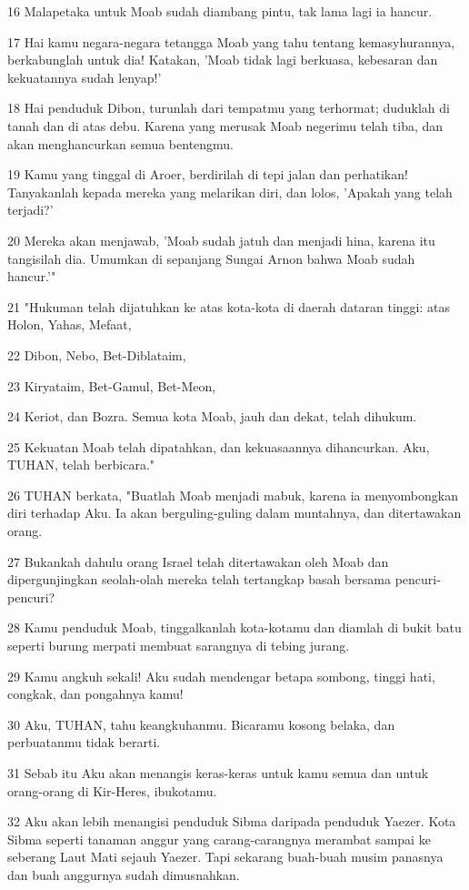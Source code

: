 \par 16 Malapetaka untuk Moab sudah diambang pintu, tak lama lagi ia hancur.
\par 17 Hai kamu negara-negara tetangga Moab yang tahu tentang kemasyhurannya, berkabunglah untuk dia! Katakan, 'Moab tidak lagi berkuasa, kebesaran dan kekuatannya sudah lenyap!'
\par 18 Hai penduduk Dibon, turunlah dari tempatmu yang terhormat; duduklah di tanah dan di atas debu. Karena yang merusak Moab negerimu telah tiba, dan akan menghancurkan semua bentengmu.
\par 19 Kamu yang tinggal di Aroer, berdirilah di tepi jalan dan perhatikan! Tanyakanlah kepada mereka yang melarikan diri, dan lolos, 'Apakah yang telah terjadi?'
\par 20 Mereka akan menjawab, 'Moab sudah jatuh dan menjadi hina, karena itu tangisilah dia. Umumkan di sepanjang Sungai Arnon bahwa Moab sudah hancur.'"
\par 21 "Hukuman telah dijatuhkan ke atas kota-kota di daerah dataran tinggi: atas Holon, Yahas, Mefaat,
\par 22 Dibon, Nebo, Bet-Diblataim,
\par 23 Kiryataim, Bet-Gamul, Bet-Meon,
\par 24 Keriot, dan Bozra. Semua kota Moab, jauh dan dekat, telah dihukum.
\par 25 Kekuatan Moab telah dipatahkan, dan kekuasaannya dihancurkan. Aku, TUHAN, telah berbicara."
\par 26 TUHAN berkata, "Buatlah Moab menjadi mabuk, karena ia menyombongkan diri terhadap Aku. Ia akan berguling-guling dalam muntahnya, dan ditertawakan orang.
\par 27 Bukankah dahulu orang Israel telah ditertawakan oleh Moab dan dipergunjingkan seolah-olah mereka telah tertangkap basah bersama pencuri-pencuri?
\par 28 Kamu penduduk Moab, tinggalkanlah kota-kotamu dan diamlah di bukit batu seperti burung merpati membuat sarangnya di tebing jurang.
\par 29 Kamu angkuh sekali! Aku sudah mendengar betapa sombong, tinggi hati, congkak, dan pongahnya kamu!
\par 30 Aku, TUHAN, tahu keangkuhanmu. Bicaramu kosong belaka, dan perbuatanmu tidak berarti.
\par 31 Sebab itu Aku akan menangis keras-keras untuk kamu semua dan untuk orang-orang di Kir-Heres, ibukotamu.
\par 32 Aku akan lebih menangisi penduduk Sibma daripada penduduk Yaezer. Kota Sibma seperti tanaman anggur yang carang-carangnya merambat sampai ke seberang Laut Mati sejauh Yaezer. Tapi sekarang buah-buah musim panasnya dan buah anggurnya sudah dimusnahkan.
